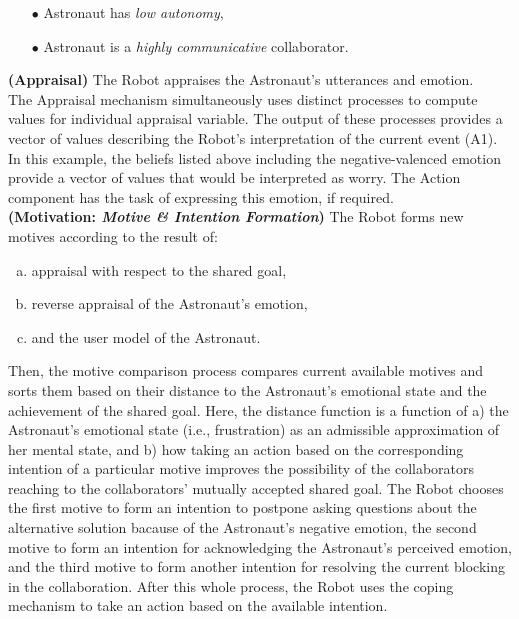 \begin{itemize}
  \item[$\bullet$] Astronaut has \textit{low autonomy},
  \item[$\bullet$] Astronaut is a \textit{highly communicative} collaborator.
\end{itemize}

\noindent \textbf{(Appraisal)} The Robot appraises the Astronaut's utterances
and emotion.\\

The Appraisal mechanism simultaneously uses distinct processes to compute values
for individual appraisal variable. The output of these processes provides a
vector of values describing the Robot's interpretation of the current event
(A1). In this example, the beliefs listed above including the negative-valenced
emotion provide a vector of values that would be interpreted as worry. The
Action component has the task of expressing this emotion, if required.\\

\noindent \textbf{(Motivation: \textit{Motive \& Intention Formation})}
The Robot forms new motives according to the result of:

\begin{enumerate}[a)]
  \item appraisal with respect to the shared goal,
  \item reverse appraisal of the Astronaut's emotion,
  \item and the user model of the Astronaut. 
\end{enumerate}

Then, the motive comparison process compares current available motives and
sorts them based on their distance to the Astronaut's emotional state and
the achievement of the shared goal. Here, the distance function is a function of
a) the Astronaut's emotional state (i.e., frustration) as an admissible
approximation of her mental state, and b) how taking an action based on the
corresponding intention of a particular motive improves the possibility of the
collaborators reaching to the collaborators' mutually accepted shared goal. The
Robot chooses the first motive to form an intention to postpone asking questions
about the alternative solution bacause of the Astronaut's negative emotion, the
second motive to form an intention for acknowledging the Astronaut's perceived
emotion, and the third motive to form another intention for resolving the
current blocking in the collaboration. After this whole process, the Robot uses
the coping mechanism to take an action based on the available intention.\\


